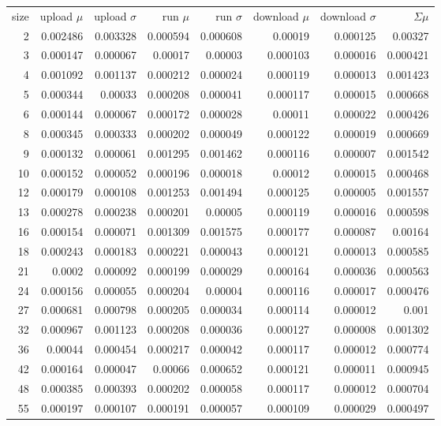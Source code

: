 \begin{longtable}{r r r r r r r r}
size & upload $\mu$  & upload $\sigma$ & run $\mu$ & run $\sigma$ & download $\mu$ & download $\sigma$ & $\Sigma \mu$ \\
2 & 0.002486 & 0.003328 & 0.000594 & 0.000608 & 0.00019 & 0.000125 & 0.00327 \\
3 & 0.000147 & 0.000067 & 0.00017 & 0.00003 & 0.000103 & 0.000016 & 0.000421 \\
4 & 0.001092 & 0.001137 & 0.000212 & 0.000024 & 0.000119 & 0.000013 & 0.001423 \\
5 & 0.000344 & 0.00033 & 0.000208 & 0.000041 & 0.000117 & 0.000015 & 0.000668 \\
6 & 0.000144 & 0.000067 & 0.000172 & 0.000028 & 0.00011 & 0.000022 & 0.000426 \\
8 & 0.000345 & 0.000333 & 0.000202 & 0.000049 & 0.000122 & 0.000019 & 0.000669 \\
9 & 0.000132 & 0.000061 & 0.001295 & 0.001462 & 0.000116 & 0.000007 & 0.001542 \\
10 & 0.000152 & 0.000052 & 0.000196 & 0.000018 & 0.00012 & 0.000015 & 0.000468 \\
12 & 0.000179 & 0.000108 & 0.001253 & 0.001494 & 0.000125 & 0.000005 & 0.001557 \\
13 & 0.000278 & 0.000238 & 0.000201 & 0.00005 & 0.000119 & 0.000016 & 0.000598 \\
16 & 0.000154 & 0.000071 & 0.001309 & 0.001575 & 0.000177 & 0.000087 & 0.00164 \\
18 & 0.000243 & 0.000183 & 0.000221 & 0.000043 & 0.000121 & 0.000013 & 0.000585 \\
21 & 0.0002 & 0.000092 & 0.000199 & 0.000029 & 0.000164 & 0.000036 & 0.000563 \\
24 & 0.000156 & 0.000055 & 0.000204 & 0.00004 & 0.000116 & 0.000017 & 0.000476 \\
27 & 0.000681 & 0.000798 & 0.000205 & 0.000034 & 0.000114 & 0.000012 & 0.001 \\
32 & 0.000967 & 0.001123 & 0.000208 & 0.000036 & 0.000127 & 0.000008 & 0.001302 \\
36 & 0.00044 & 0.000454 & 0.000217 & 0.000042 & 0.000117 & 0.000012 & 0.000774 \\
42 & 0.000164 & 0.000047 & 0.00066 & 0.000652 & 0.000121 & 0.000011 & 0.000945 \\
48 & 0.000385 & 0.000393 & 0.000202 & 0.000058 & 0.000117 & 0.000012 & 0.000704 \\
55 & 0.000197 & 0.000107 & 0.000191 & 0.000057 & 0.000109 & 0.000029 & 0.000497 \\

\end{longtable}
